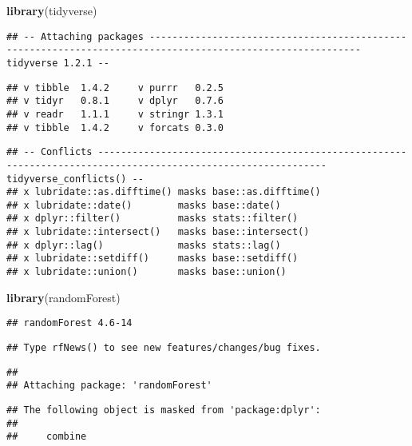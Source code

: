 \documentclass[]{article}
\title{}
\author{}
\date{}
\newenvironment{Shaded}{\begin{snugshade}}{\end{snugshade}}
\newcommand{\KeywordTok}[1]{\textcolor[rgb]{0.13,0.29,0.53}{\textbf{#1}}}
\newcommand{\NormalTok}[1]{#1}
\begin{document}
\begin{Shaded}
\begin{Highlighting}[]
\KeywordTok{library}\NormalTok{(tidyverse)}
\end{Highlighting}
\end{Shaded}

\begin{verbatim}
## -- Attaching packages ----------------------------------------------------------------------------------------------------------- tidyverse 1.2.1 --
\end{verbatim}

\begin{verbatim}
## v tibble  1.4.2     v purrr   0.2.5
## v tidyr   0.8.1     v dplyr   0.7.6
## v readr   1.1.1     v stringr 1.3.1
## v tibble  1.4.2     v forcats 0.3.0
\end{verbatim}

\begin{verbatim}
## -- Conflicts -------------------------------------------------------------------------------------------------------------- tidyverse_conflicts() --
## x lubridate::as.difftime() masks base::as.difftime()
## x lubridate::date()        masks base::date()
## x dplyr::filter()          masks stats::filter()
## x lubridate::intersect()   masks base::intersect()
## x dplyr::lag()             masks stats::lag()
## x lubridate::setdiff()     masks base::setdiff()
## x lubridate::union()       masks base::union()
\end{verbatim}

\begin{Shaded}
\begin{Highlighting}[]
\KeywordTok{library}\NormalTok{(randomForest)}
\end{Highlighting}
\end{Shaded}

\begin{verbatim}
## randomForest 4.6-14
\end{verbatim}

\begin{verbatim}
## Type rfNews() to see new features/changes/bug fixes.
\end{verbatim}

\begin{verbatim}
## 
## Attaching package: 'randomForest'
\end{verbatim}

\begin{verbatim}
## The following object is masked from 'package:dplyr':
## 
##     combine
\end{verbatim}
\end{document}
